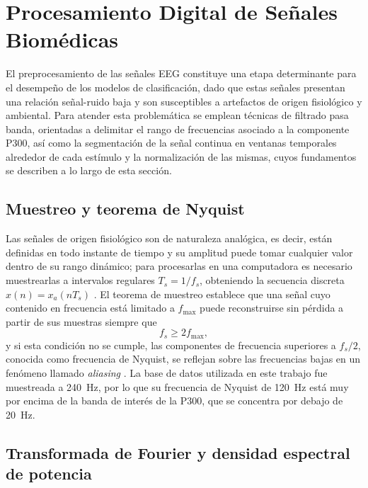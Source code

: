 \section[PROCESAMIENTO DIGITAL DE SEÑALES BIOMÉDICAS]{Procesamiento Digital de Señales
Biomédicas}
\label{sec:pds}

El preprocesamiento de las señales EEG constituye una etapa determinante para el desempeño de
los modelos de clasificación, dado que estas señales presentan una relación señal-ruido baja y
son susceptibles a artefactos de origen fisiológico y ambiental. Para atender esta problemática
se emplean técnicas de filtrado pasa banda, orientadas a delimitar el rango de frecuencias
asociado a la componente P300, así como la segmentación de la señal continua en ventanas
temporales alrededor de cada estímulo y la normalización de las mismas, cuyos fundamentos se
describen a lo largo de esta sección.

\subsection{Muestreo y teorema de Nyquist}

Las señales de origen fisiológico son de naturaleza analógica, es decir, están definidas en todo
instante de tiempo y su amplitud puede tomar cualquier valor dentro de su rango dinámico; para
procesarlas en una computadora es necesario muestrearlas a intervalos regulares
$T_s = 1/f_s$, obteniendo la secuencia discreta $x(n) = x_a(nT_s)$ \cite{proakis2007}. El teorema
de muestreo establece que una señal cuyo contenido en frecuencia está limitado a $f_{\max}$ puede
reconstruirse sin pérdida a partir de sus muestras siempre que
\begin{equation}
f_s \geq 2 f_{\max},
\label{eq:nyquist}
\end{equation}
y si esta condición no se cumple, las componentes de frecuencia superiores a $f_s/2$, conocida
como frecuencia de Nyquist, se reflejan sobre las frecuencias bajas en un fenómeno llamado
\textit{aliasing} \cite{oppenheim2010}. La base de datos utilizada en este trabajo fue muestreada a
240~Hz, por lo que su frecuencia de Nyquist de 120~Hz está muy por encima de la banda de interés
de la P300, que se concentra por debajo de 20~Hz.

\subsection{Transformada de Fourier y densidad espectral de potencia}

